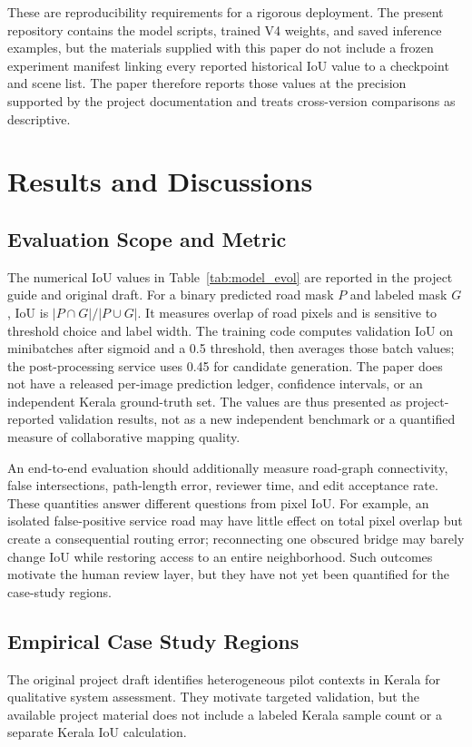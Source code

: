 \documentclass[10pt,a4paper,twocolumn]{article}
\begin{document}
These are reproducibility requirements for a rigorous deployment. The present repository contains the model scripts, trained V4 weights, and saved inference examples, but the materials supplied with this paper do not include a frozen experiment manifest linking every reported historical IoU value to a checkpoint and scene list. The paper therefore reports those values at the precision supported by the project documentation and treats cross-version comparisons as descriptive.

\section{Results and Discussions}

\subsection{Evaluation Scope and Metric}
The numerical IoU values in Table~\ref{tab:model_evol} are reported in the project guide and original draft. For a binary predicted road mask $P$ and labeled mask $G$, IoU is $|P\cap G|/|P\cup G|$. It measures overlap of road pixels and is sensitive to threshold choice and label width. The training code computes validation IoU on minibatches after sigmoid and a 0.5 threshold, then averages those batch values; the post-processing service uses 0.45 for candidate generation. The paper does not have a released per-image prediction ledger, confidence intervals, or an independent Kerala ground-truth set. The values are thus presented as project-reported validation results, not as a new independent benchmark or a quantified measure of collaborative mapping quality.

An end-to-end evaluation should additionally measure road-graph connectivity, false intersections, path-length error, reviewer time, and edit acceptance rate. These quantities answer different questions from pixel IoU. For example, an isolated false-positive service road may have little effect on total pixel overlap but create a consequential routing error; reconnecting one obscured bridge may barely change IoU while restoring access to an entire neighborhood. Such outcomes motivate the human review layer, but they have not yet been quantified for the case-study regions.

\subsection{Empirical Case Study Regions}
The original project draft identifies heterogeneous pilot contexts in Kerala for qualitative system assessment. They motivate targeted validation, but the available project material does not include a labeled Kerala sample count or a separate Kerala IoU calculation.
\end{document}
